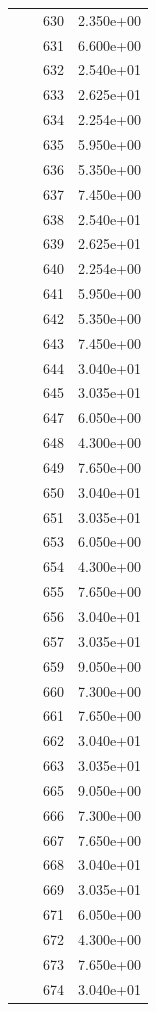 \documentclass[12pt]{article}
\begin{document}
\begin{longtable}{@{}cccc@{}}
 &  & 630 & 2.350e+00 \\
 &  & 631 & 6.600e+00 \\
 &  & 632 & 2.540e+01 \\
 &  & 633 & 2.625e+01 \\
 &  & 634 & 2.254e+00 \\
 &  & 635 & 5.950e+00 \\
 &  & 636 & 5.350e+00 \\
 &  & 637 & 7.450e+00 \\
 &  & 638 & 2.540e+01 \\
 &  & 639 & 2.625e+01 \\
 &  & 640 & 2.254e+00 \\
 &  & 641 & 5.950e+00 \\
 &  & 642 & 5.350e+00 \\
 &  & 643 & 7.450e+00 \\
 &  & 644 & 3.040e+01 \\
 &  & 645 & 3.035e+01 \\
 &  & 647 & 6.050e+00 \\
 &  & 648 & 4.300e+00 \\
 &  & 649 & 7.650e+00 \\
 &  & 650 & 3.040e+01 \\
 &  & 651 & 3.035e+01 \\
 &  & 653 & 6.050e+00 \\
 &  & 654 & 4.300e+00 \\
 &  & 655 & 7.650e+00 \\
 &  & 656 & 3.040e+01 \\
 &  & 657 & 3.035e+01 \\
 &  & 659 & 9.050e+00 \\
 &  & 660 & 7.300e+00 \\
 &  & 661 & 7.650e+00 \\
 &  & 662 & 3.040e+01 \\
 &  & 663 & 3.035e+01 \\
 &  & 665 & 9.050e+00 \\
 &  & 666 & 7.300e+00 \\
 &  & 667 & 7.650e+00 \\
 &  & 668 & 3.040e+01 \\
 &  & 669 & 3.035e+01 \\
 &  & 671 & 6.050e+00 \\
 &  & 672 & 4.300e+00 \\
 &  & 673 & 7.650e+00 \\
 &  & 674 & 3.040e+01 \\

\end{longtable}
\end{document}
